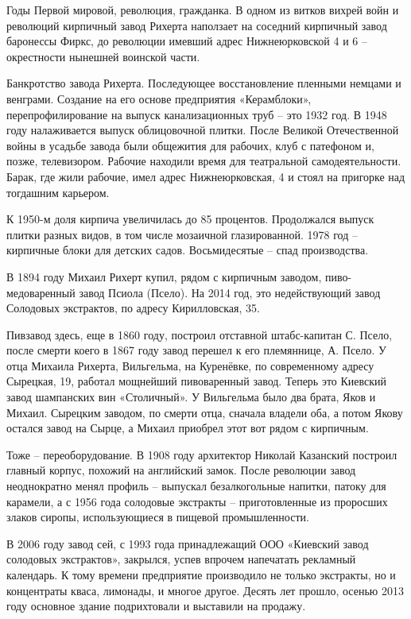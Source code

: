 Годы Первой мировой, революция, гражданка. В одном из витков вихрей войн и революций кирпичный завод Рихерта наползает на соседний кирпичный завод баронессы Фиркс, до революции имевший адрес Нижнеюрковской 4 и 6 – окрестности нынешней воинской части.

Банкротство завода Рихерта. Последующее восстановление пленными немцами и венграми. Создание на его основе предприятия «Керамблоки», перепрофилирование на выпуск канализационных труб – это 1932 год. В 1948 году налаживается выпуск облицовочной плитки. После Великой Отечественной войны в усадьбе завода были общежития для рабочих, клуб с патефоном и, позже, телевизором. Рабочие находили время для театральной самодеятельности. Барак, где жили рабочие, имел адрес Нижнеюрковская, 4 и стоял на пригорке над тогдашним карьером.

К 1950-м доля кирпича увеличилась до 85 процентов. Продолжался выпуск плитки разных видов, в том числе мозаичной глазированной. 1978 год – кирпичные блоки для детских садов. Восьмидесятые – спад производства.

В 1894 году Михаил Рихерт купил, рядом с кирпичным заводом, пиво-медоваренный завод Псиола (Псело). На 2014 год, это недействующий завод Солодовых экстрактов, по адресу Кирилловская, 35. 

Пивзавод здесь, еще в 1860 году, построил отставной штабс-капитан С. Псело, после смерти коего в 1867 году завод перешел к его племяннице, А. Псело. У отца Михаила Рихерта, Вильгельма, на Куренёвке, по современному адресу Сырецкая, 19, работал мощнейший пивоваренный завод. Теперь это Киевский завод шампанских вин «Столичный». У Вильгельма было два брата, Яков и Михаил. Сырецким заводом, по смерти отца, сначала владели оба, а потом Якову остался завод на Сырце, а Михаил приобрел этот вот рядом с кирпичным.

Тоже – переоборудование. В 1908 году архитектор Николай Казанский построил главный корпус, похожий на английский замок. После революции завод неоднократно менял профиль – выпускал безалкогольные напитки, патоку для карамели, а с 1956 года солодовые экстракты – приготовленные из проросших злаков сиропы, использующиеся в пищевой промышленности. 

В 2006 году завод сей, с 1993 года принадлежащий ООО «Киевский завод солодовых экстрактов», закрылся, успев впрочем напечатать рекламный календарь. К тому времени предприятие производило не только экстракты, но и концентраты кваса, лимонады, и многое другое. Десять лет прошло, осенью 2013 году основное здание подрихтовали и выставили на продажу. 


